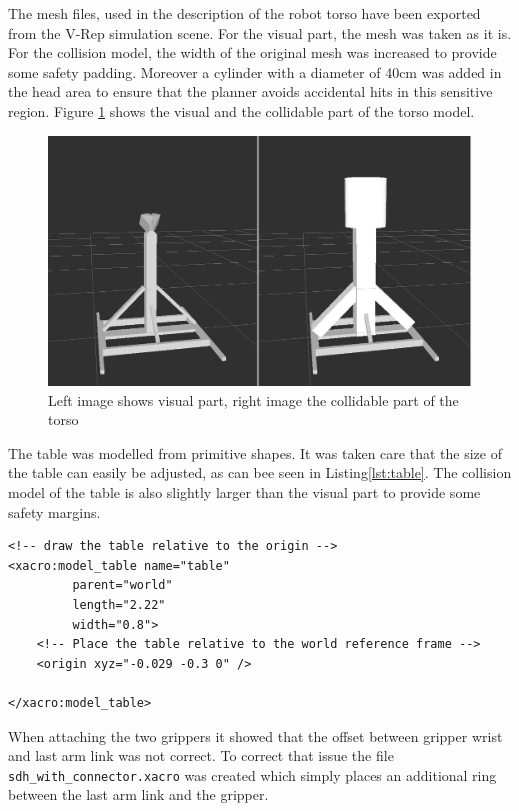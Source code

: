 The mesh files, used in the description of the robot torso have been exported from the V-Rep simulation scene. For the visual part, the mesh was taken as it is. For the collision model, the width of the original mesh was increased to provide some safety padding. Moreover a cylinder with a diameter of 40cm was added in the head area to ensure that the planner avoids accidental hits in this sensitive region. Figure \ref{fig:torso_col} shows the visual and the collidable part of the torso model.
\begin{figure}
	\centering
  	\includegraphics[width=1.0\textwidth]{images/torso.jpg}
	\caption[Visual and collidable model of torso]{Left image shows visual part, right image the collidable part of the torso}
	\label{fig:torso_col}
\end{figure}
The table was modelled from primitive shapes. It was taken care that the size of the table can easily be adjusted, as can bee seen in Listing\ref{lst:table}. The collision model of the table is also slightly larger than the visual part to provide some safety margins.
\lstset{language=XML,style=customxml}
\begin{minipage}{\linewidth}
\begin{lstlisting}[caption={XML snippet, inserting the table model into the URDF}, label=lst:table]
<!-- draw the table relative to the origin -->
<xacro:model_table name="table" 
	     parent="world"
	     length="2.22"
	     width="0.8">
	<!-- Place the table relative to the world reference frame -->
	<origin xyz="-0.029 -0.3 0" />
    
</xacro:model_table>
\end{lstlisting}
\end{minipage}

When attaching the two grippers it showed that the offset between gripper wrist and last arm link was not correct. To correct that issue the file \texttt{sdh\_with\_connector.xacro} was created which simply places an additional ring between the last arm link and the gripper.\\

